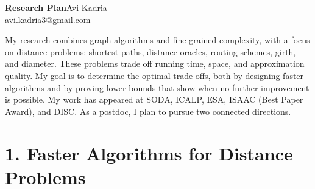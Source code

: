 \documentclass[11pt,a4paper]{article}
\begin{document}
{\large\bfseries\color{accent}Research Plan}\hfill Avi Kadria\\[0.1em]
\null\hfill{\small\color{subtle}\href{mailto:avi.kadria3@gmail.com}{avi.kadria3@gmail.com}}
\par\vspace{0.3em}

My research combines graph algorithms and fine-grained complexity, with a focus on distance problems: shortest paths, distance oracles, routing schemes, girth, and diameter. These problems trade off running time, space, and approximation quality. My goal is to determine the optimal trade-offs, both by designing faster algorithms and by proving lower bounds that show when no further improvement is possible. My work has appeared at SODA, ICALP, ESA, ISAAC (Best Paper Award), and DISC. As a postdoc, I plan to pursue two connected directions.

\section{1. Faster Algorithms for Distance Problems}
\end{document}
